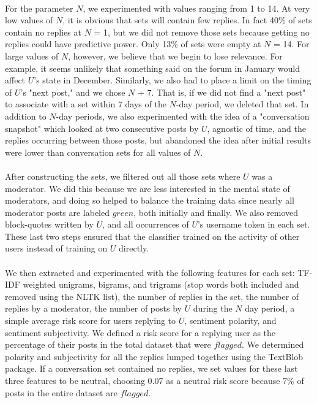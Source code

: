 \documentclass{article}
\begin{document}
\paragraph{}For the parameter $N$, we experimented with values ranging from 1 to 14. At very low values of $N$, it is obvious that sets will contain few replies. In fact 40\% of sets contain no replies at $N$ = 1, but we did not remove those sets because getting no replies could have predictive power. Only 13\% of sets were empty at $N$ = 14. For large values of $N$, however, we believe that we begin to lose relevance. For example, it seems unlikely that something said on the forum in January would affect $U$'s state in December. Similarly, we also had to place a limit on the timing of $U$'s "next post," and we chose $N$ + 7. That is, if we did not find a "next post" to associate with a set within 7 days of the $N$-day period, we deleted that set. In addition to $N$-day periods, we also experimented with the idea of a "conversation snapshot" which looked at two consecutive posts by $U$, agnostic of time, and the replies occurring between those posts, but abandoned the idea after initial results were lower than conversation sets for all values of $N$.

\paragraph{}After constructing the sets, we filtered out all those sets where $U$ was a moderator. We did this because we are less interested in the mental state of moderators, and doing so helped to balance the training data since nearly all moderator posts are labeled $green$, both initially and finally. We also removed block-quotes written by $U$, and all occurrences of $U$'s username token in each set. These last two steps ensured that the classifier trained on the activity of other users instead of training on $U$ directly.

\paragraph{}We then extracted and experimented with the following features for each set: TF-IDF weighted unigrams, bigrams, and trigrams (stop words both included and removed using the NLTK list), the number of replies in the set, the number of replies by a moderator, the number of posts by $U$ during the $N$ day period, a simple average risk score for users replying to $U$, sentiment polarity, and sentiment subjectivity. We defined a risk score for a replying user as the percentage of their posts in the total dataset that were $flagged$. We determined polarity and subjectivity for all the replies lumped together using the TextBlob package. If a conversation set contained no replies, we set values for these last three features to be neutral, choosing 0.07 as a neutral risk score because 7\% of posts in the entire dataset are $flagged$.
\end{document}
